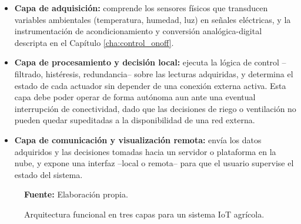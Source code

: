 \begin{itemize}
    \item \textbf{Capa de adquisición:} comprende los sensores físicos que transducen variables ambientales (temperatura, humedad, luz) en señales eléctricas, y la instrumentación de acondicionamiento y conversión analógica-digital descripta en el Capítulo \ref{cha:control_onoff}.
    \item \textbf{Capa de procesamiento y decisión local:} ejecuta la lógica de control --filtrado, histéresis, redundancia-- sobre las lecturas adquiridas, y determina el estado de cada actuador sin depender de una conexión externa activa. Esta capa debe poder operar de forma autónoma aun ante una eventual interrupción de conectividad, dado que las decisiones de riego o ventilación no pueden quedar supeditadas a la disponibilidad de una red externa.
    \item \textbf{Capa de comunicación y visualización remota:} envía los datos adquiridos y las decisiones tomadas hacia un servidor o plataforma en la nube, y expone una interfaz --local o remota-- para que el usuario supervise el estado del sistema.
\end{itemize}

\begin{figure}[htbp]
\centering
\shorthandoff{><}%
\caption{Arquitectura funcional en tres capas para un sistema IoT agrícola.}
\vspace{2mm}
{\footnotesize \textbf{Fuente:} Elaboración propia.}
\label{fig:iot_capas}
\end{figure}

